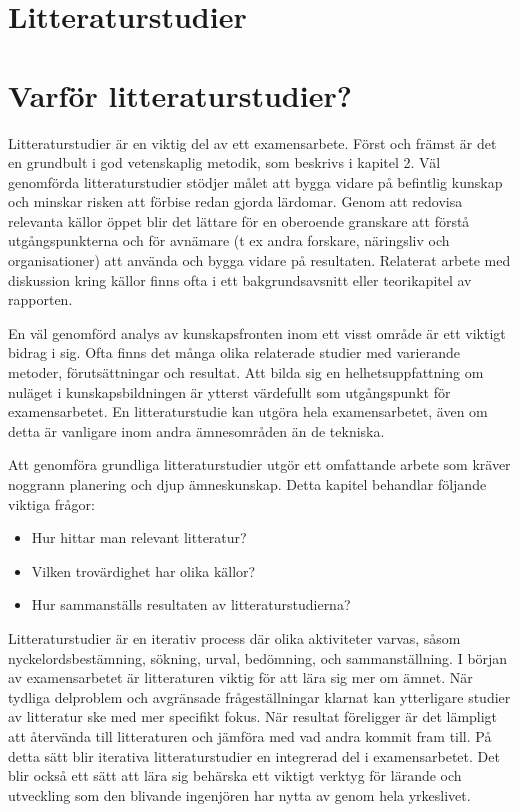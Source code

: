 \section{Litteraturstudier}\label{litteraturstudier}

\section{Varför litteraturstudier?}\label{varfuxf6r-litteraturstudier}

Litteraturstudier är en viktig del av ett examensarbete. Först och
främst är det en grundbult i god vetenskaplig metodik, som beskrivs i
kapitel 2. Väl genomförda litteraturstudier stödjer målet att bygga
vidare på befintlig kunskap och minskar risken att förbise redan gjorda
lärdomar. Genom att redovisa relevanta källor öppet blir det lättare för
en oberoende granskare att förstå utgångspunkterna och för avnämare (t
ex andra forskare, näringsliv och organisationer) att använda och bygga
vidare på resultaten. Relaterat arbete med diskussion kring källor finns
ofta i ett bakgrundsavsnitt eller teorikapitel av rapporten.

En väl genomförd analys av kunskapsfronten inom ett visst område är ett
viktigt bidrag i sig. Ofta finns det många olika relaterade studier med
varierande metoder, förutsättningar och resultat. Att bilda sig en
helhetsuppfattning om nuläget i kunskapsbildningen är ytterst värdefullt
som utgångspunkt för examensarbetet. En litteraturstudie kan utgöra hela
examensarbetet, även om detta är vanligare inom andra ämnesområden än de
tekniska.

Att genomföra grundliga litteraturstudier utgör ett omfattande arbete
som kräver noggrann planering och djup ämneskunskap. Detta kapitel
behandlar följande viktiga frågor:

\begin{itemize}
\item
  Hur hittar man relevant litteratur?
\item
  Vilken trovärdighet har olika källor?
\item
  Hur sammanställs resultaten av litteraturstudierna?
\end{itemize}

Litteraturstudier är en iterativ process där olika aktiviteter varvas,
såsom nyckelordsbestämning, sökning, urval, bedömning, och
sammanställning. I början av examensarbetet är litteraturen viktig för
att lära sig mer om ämnet. När tydliga delproblem och avgränsade
frågeställningar klarnat kan ytterligare studier av litteratur ske med
mer specifikt fokus. När resultat föreligger är det lämpligt att
återvända till litteraturen och jämföra med vad andra kommit fram till.
På detta sätt blir iterativa litteraturstudier en integrerad del i
examensarbetet. Det blir också ett sätt att lära sig behärska ett
viktigt verktyg för lärande och utveckling som den blivande ingenjören
har nytta av genom hela yrkeslivet.

